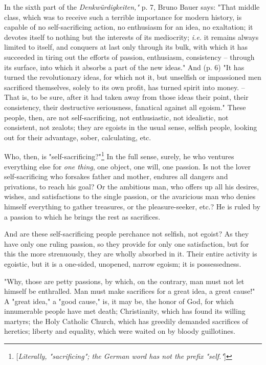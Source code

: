 \documentclass[a4paper]{book}
\begin{document}
In the sixth part of the \textit{Denkw\"urdigkeiten,"{}} p. 7, Bruno Bauer 
says: "{}That middle class, which was to receive such a terrible importance 
for modern history, is capable of no self-sacrificing action, no enthusiasm 
for an idea, no exaltation; it devotes itself to nothing but the interests of 
its mediocrity; \textit{i.e.} it remains always limited to itself, and 
conquers at last only through its bulk, with which it has succeeded in tiring 
out the efforts of passion, enthusiasm, consistency -- through its surface, 
into which it absorbs a part of the new ideas."{} And (p. 6) "{}It has turned 
the revolutionary ideas, for which not it, but unselfish or impassioned men 
sacrificed themselves, solely to its own profit, has turned spirit into money. 
-- That is, to be sure, after it had taken away from those ideas their point, 
their consistency, their destructive seriousness, fanatical against all 
egoism."{} These people, then, are not self-sacrificing, not enthusiastic, not 
idealistic, not consistent, not zealots; they are egoists in the usual sense, 
selfish people, looking out for their advantage, sober, calculating, etc.

Who, then, is "{}self-sacrificing?"{}\footnote{[\textit{Literally, 
"{}sacrificing"{}; the German word has not the prefix "{}self."{}}]} In the 
full sense, surely, he who ventures everything else for \textit{one thing}, 
one object, one will, one passion. Is not the lover self-sacrificing who 
forsakes father and mother, endures all dangers and privations, to reach his 
goal? Or the ambitious man, who offers up all his desires, wishes, and 
satisfactions to the single passion, or the avaricious man who denies himself 
everything to gather treasures, or the pleasure-seeker, etc.? He is ruled by a 
passion to which he brings the rest as sacrifices.

And are these self-sacrificing people perchance not selfish, not egoist? As 
they have only one ruling passion, so they provide for only one satisfaction, 
but for this the more strenuously, they are wholly absorbed in it. Their 
entire activity is egoistic, but it is a one-sided, unopened, narrow egoism; 
it is possessedness.

"{}Why, those are petty passions, by which, on the contrary, man must not let 
himself be enthralled. Man must make sacrifices for a great idea, a great 
cause!"{} A "{}great idea,"{} a "{}good cause,"{} is, it may be, the honor of 
God, for which innumerable people have met death; Christianity, which has 
found its willing martyrs; the Holy Catholic Church, which has greedily 
demanded sacrifices of heretics; liberty and equality, which were waited on by 
bloody guillotines.
\end{document}
